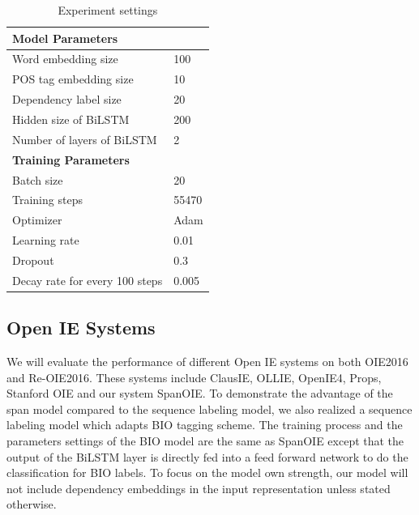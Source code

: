 \documentclass[letterpaper]{article} %
\begin{document}
\begin{table}[t!]
\begin{center}
\begin{tabular}{|l|l|}
\hline 
\textbf{Model Parameters} & \\
\hline 
Word embedding size & 100 \\ 
POS tag embedding size & 10\\
Dependency label size & 20 \\
Hidden size of BiLSTM & 200 \\
Number of layers of BiLSTM & 2 \\
\hline 
\textbf{Training Parameters} & \\
\hline 
Batch size & 20\\
Training steps & 55470\\
Optimizer & Adam \\
Learning rate & 0.01 \\
Dropout & 0.3 \\
Decay rate for every 100 steps & 0.005 \\
\hline
\end{tabular}
\end{center}
\caption{Experiment settings}
\label{parameters}
\end{table}

\subsection{Open IE Systems}
We will evaluate the performance of different Open IE systems on both OIE2016 and Re-OIE2016. These systems include ClausIE, OLLIE, OpenIE4, Props, Stanford OIE and our system SpanOIE. To demonstrate the advantage of the span model compared to the sequence labeling model, we also realized a sequence labeling model which adapts BIO tagging scheme. The training process and the parameters settings of the BIO model are the same as SpanOIE  except that the output of the BiLSTM layer is directly fed into a feed forward network to do the classification for BIO labels. To focus on the model own strength, our model will not include dependency embeddings in the input representation unless stated otherwise. 
\end{document}
